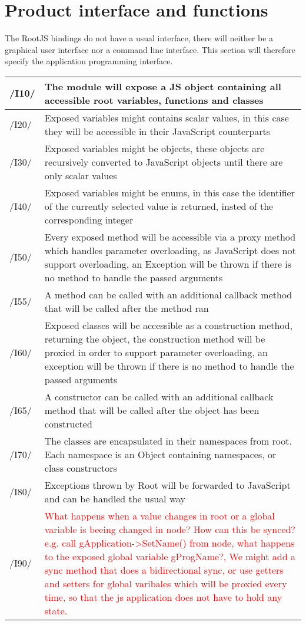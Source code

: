 \chapter{Product interface and functions}
The RootJS bindings do not have a usual interface, there will neither be a graphical user interface nor a command line interface.
This section will therefore specify the application programming interface.


\begin{longtable}{|p{1cm} | p{10cm}|}
   \hline
  /I10/ & The module will expose a JS object containing all accessible root variables, functions and classes \\
  \hline
  /I20/ & Exposed variables might contains scalar values, in this case they will be accessible in their JavaScript counterparts \\
  \hline
  /I30/ & Exposed variables might be objects, these objects are recursively converted to JavaScript objects until there are only scalar values \\
  \hline
  /I40/ & Exposed variables might be enums, in this case the identifier of the currently selected value is returned, insted of the corresponding integer \\
  \hline
  /I50/ & Every exposed method will be accessible via a proxy method which handles parameter overloading, as JavaScript does not support overloading, an Exception will be thrown if there is no method to handle the passed arguments \\
  \hline
  /I55/ & A method can be called with an additional callback method that will be called after the method ran \\
  \hline
  /I60/ & Exposed classes will be accessible as a construction method, returning the object, the construction method will be proxied in order to support parameter overloading, an exception will be thrown if there is no method to handle the passed arguments \\
  \hline
  /I65/ & A constructor can be called with an additional callback method that will be called after the object has been constructed \\
  \hline
  /I70/ & The classes are encapsulated in their namespaces from root. Each namespace is an Object containing namespaces, or class constructors \\
  \hline
  /I80/ & Exceptions thrown by Root will be forwarded to JavaScript and can be handled the usual way \\
  \hline
  /I90/ & \textcolor{red}{What happens when a value changes in root or a global variable is beeing changed in node? How can this be synced? e.g. call gApplication->SetName() from node, what happens to the exposed global variable gProgName?, We might add a sync method that does a bidirectional sync, or use getters and setters for global varibales which will be proxied every time, so that the js application does not have to hold any state.} \\
   \hline
\end{longtable}
